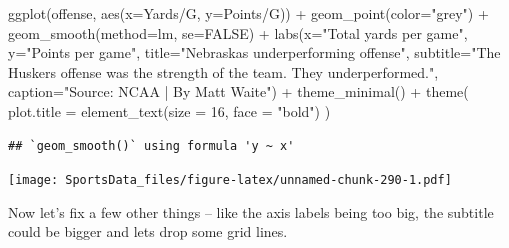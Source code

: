 \documentclass[
]{book}
\newenvironment{Shaded}{\begin{snugshade}}{\end{snugshade}}
\newcommand{\AttributeTok}[1]{\textcolor[rgb]{0.77,0.63,0.00}{#1}}
\newcommand{\ConstantTok}[1]{\textcolor[rgb]{0.00,0.00,0.00}{#1}}
\newcommand{\DecValTok}[1]{\textcolor[rgb]{0.00,0.00,0.81}{#1}}
\newcommand{\FunctionTok}[1]{\textcolor[rgb]{0.00,0.00,0.00}{#1}}
\newcommand{\NormalTok}[1]{#1}
\newcommand{\SpecialCharTok}[1]{\textcolor[rgb]{0.00,0.00,0.00}{#1}}
\newcommand{\StringTok}[1]{\textcolor[rgb]{0.31,0.60,0.02}{#1}}
\begin{document}
\begin{Shaded}
\begin{Highlighting}[]
\FunctionTok{ggplot}\NormalTok{(offense, }\FunctionTok{aes}\NormalTok{(}\AttributeTok{x=}\StringTok{\textasciigrave{}}\AttributeTok{Yards/G}\StringTok{\textasciigrave{}}\NormalTok{, }\AttributeTok{y=}\StringTok{\textasciigrave{}}\AttributeTok{Points/G}\StringTok{\textasciigrave{}}\NormalTok{)) }\SpecialCharTok{+} 
  \FunctionTok{geom\_point}\NormalTok{(}\AttributeTok{color=}\StringTok{"grey"}\NormalTok{) }\SpecialCharTok{+} \FunctionTok{geom\_smooth}\NormalTok{(}\AttributeTok{method=}\NormalTok{lm, }\AttributeTok{se=}\ConstantTok{FALSE}\NormalTok{) }\SpecialCharTok{+} 
  \FunctionTok{labs}\NormalTok{(}\AttributeTok{x=}\StringTok{"Total yards per game"}\NormalTok{, }\AttributeTok{y=}\StringTok{"Points per game"}\NormalTok{, }\AttributeTok{title=}\StringTok{"Nebraska\textquotesingle{}s underperforming offense"}\NormalTok{, }\AttributeTok{subtitle=}\StringTok{"The Husker\textquotesingle{}s offense was the strength of the team. They underperformed."}\NormalTok{, }\AttributeTok{caption=}\StringTok{"Source: NCAA | By Matt Waite"}\NormalTok{) }\SpecialCharTok{+} 
  \FunctionTok{theme\_minimal}\NormalTok{() }\SpecialCharTok{+} 
  \FunctionTok{theme}\NormalTok{(}
    \AttributeTok{plot.title =} \FunctionTok{element\_text}\NormalTok{(}\AttributeTok{size =} \DecValTok{16}\NormalTok{, }\AttributeTok{face =} \StringTok{"bold"}\NormalTok{)}
\NormalTok{    ) }
\end{Highlighting}
\end{Shaded}

\begin{verbatim}
## `geom_smooth()` using formula 'y ~ x'
\end{verbatim}

\texttt{[image: SportsData\_files/figure-latex/unnamed-chunk-290-1.pdf]}

Now let's fix a few other things -- like the axis labels being too big, the subtitle could be bigger and lets drop some grid lines.
\end{document}
